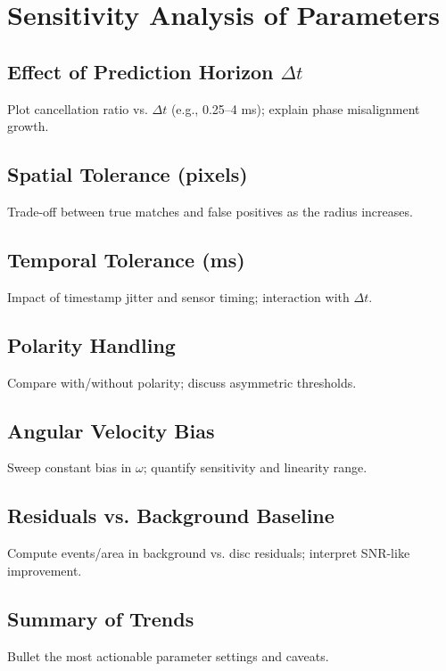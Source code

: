 \chapter{Sensitivity Analysis of Parameters}\label{chap:metrics}

\section{Effect of Prediction Horizon \(\Delta t\)}
Plot cancellation ratio vs. \(\Delta t\) (e.g., 0.25–4 ms); explain phase misalignment growth.

\section{Spatial Tolerance (pixels)}
Trade-off between true matches and false positives as the radius increases.

\section{Temporal Tolerance (ms)}
Impact of timestamp jitter and sensor timing; interaction with \(\Delta t\).

\section{Polarity Handling}
Compare with/without polarity; discuss asymmetric thresholds.

\section{Angular Velocity Bias}
Sweep constant bias in \(\omega\); quantify sensitivity and linearity range.

\section{Residuals vs. Background Baseline}
Compute events/area in background vs. disc residuals; interpret SNR-like improvement.

\section{Summary of Trends}
Bullet the most actionable parameter settings and caveats.
